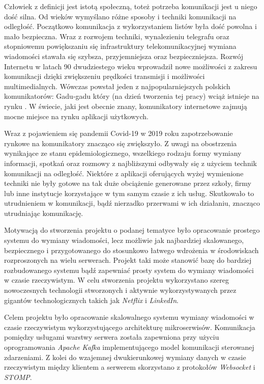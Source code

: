
Człowiek z definicji jest istotą społeczną, toteż potrzeba komunikacji jest u niego dość silna. Od wieków wymyślano
różne sposoby i techniki komunikacji na odległość. Początkowo komunikacja z wykorzystaniem listów była dość powolna i
mało bezpieczna. Wraz z rozwojem techniki, wynalezieniu telegrafu oraz stopniowemu powiększaniu się infrastruktury
telekomunikacyjnej wymiana wiadomości stawała się szybsza, przyjemniejsza oraz bezpieczniejsza. Rozwój Internetu w
latach 90 dwudziestego wieku wprowadził nowe możliwości z zakresu komunikacji dzięki zwiększeniu prędkości transmisji i
możliwości multimedialnych. Wówczas powstał jeden z najpopularniejszych polskich komunikatorów: Gadu-gadu który (na
dzień tworzenia tej pracy) wciąż istnieje na rynku \cite{bib:mszutiak}. W świecie, jaki jest obecnie znany, komunikatory
internetowe zajmują mocne miejsce na rynku aplikacji użytkowych.

Wraz z pojawieniem się pandemii Covid-19 w 2019 roku zapotrzebowanie rynkowe na komunikatory znacząco się zwiększyło. Z
uwagi na obostrzenia wynikające ze stanu epidemiologicznego, wszelkiego rodzaju formy wymiany informacji, spotkań oraz
rozmowy z najbliższymi odbywały się z użyciem technik komunikacji na odległość. Niektóre z aplikacji oferujących wyżej
wymienione techniki nie były gotowe na tak duże obciążenie generowane przez szkoły, firmy lub inne instytucje
korzystające w tym samym czasie z ich usług. Skutkowało to utrudnieniem w komunikacji, bądź nierzadko przerwami w ich
działaniu, znacząco utrudniając komunikację.

Motywacją do stworzenia projektu o podanej tematyce było opracowanie prostego systemu do wymiany wiadomości, lecz
możliwie jak najbardziej skalowanego, bezpiecznego i przygotowanego do stosunkowo łatwego wdrożenia w środowiskach
rozproszonych na wielu serwerach. Projekt taki może stanowić bazę do bardziej rozbudowanego systemu bądź zapewniać
prosty system do wymiany wiadomości w czasie rzeczywistym. W celu stworzenia projektu wykorzystano szereg nowoczesnych
technologii stworzonych i aktywnie wykorzystywanych przez gigantów technologicznych takich jak \textit{Netflix} i
\textit{LinkedIn}.


Celem projektu było opracowanie skalowalnego systemu wymiany wiadomości w czasie rzeczywistym wykorzystującego
architekturę mikroserwisów. Komunikacja pomiędzy usługami warstwy serwera została zapewniona przy użyciu oprogramowania
\textit{Apache Kafka} implementującego model komunikacji sterowanej zdarzeniami. Z kolei do wzajemnej dwukierunkowej
wymiany danych w czasie rzeczywistym między klientem a serwerem skorzystano z protokołów \textit{Websocket} i
\textit{STOMP}.

